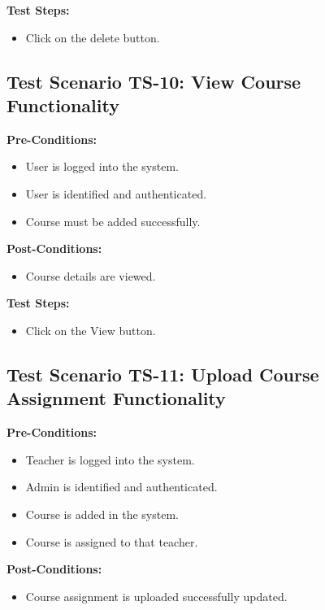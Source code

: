 \textbf{Test Steps:}
\begin{itemize}

\item Click on the delete button.

\end{itemize}

\subsection{Test Scenario TS-10: View Course Functionality}
\textbf{Pre-Conditions: }
\begin{itemize}

\item User is logged into the system.
\item User is identified and authenticated.
\item Course must be added successfully.

\end{itemize}
\textbf{Post-Conditions: }
\begin{itemize}
\item Course details are viewed.
\end{itemize}

\textbf{Test Steps:}
\begin{itemize}

\item Click on the View button.

\end{itemize}


\subsection{Test Scenario TS-11: Upload Course Assignment Functionality}
\textbf{Pre-Conditions: } 
\begin{itemize}

\item Teacher is logged into the system.
\item Admin is identified and authenticated.
\item Course is added in the system.
\item Course is assigned to that teacher.

\end{itemize}

\textbf{Post-Conditions: } 
\begin{itemize}
\item Course assignment is uploaded successfully updated.
\end{itemize}

